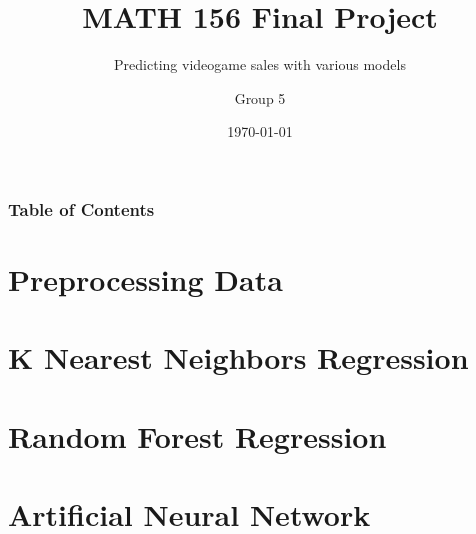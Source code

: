 \documentclass{beamer}
\title{MATH 156 Final Project}
\subtitle{Predicting videogame sales with various models}
\author{Group 5}
\institute{University of California, Los Angeles}
\date{\today}
\begin{document}
\begin{frame}
    \titlepage
\end{frame}

\begin{frame}
    \frametitle{Table of Contents}
    \tableofcontents
\end{frame}

\section{Preprocessing Data}


\section{K Nearest Neighbors Regression}


\section{Random Forest Regression}


\section{Artificial Neural Network}

\end{document}
